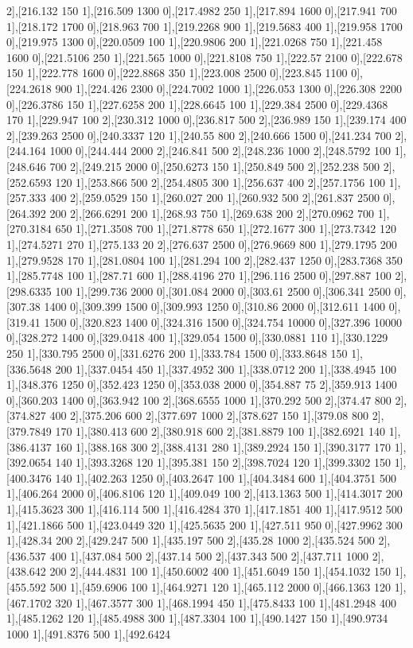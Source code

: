 {2],[216.132 150 1],[216.509 1300 0],[217.4982 250 1],[217.894 1600 0],[217.941 700 1],[218.172 1700 0],[218.963 700 1],[219.2268 900 1],[219.5683 400 1],[219.958 1700 0],[219.975 1300 0],[220.0509 100 1],[220.9806 200 1],[221.0268 750 1],[221.458 1600 0],[221.5106 250 1],[221.565 1000 0],[221.8108 750 1],[222.57 2100 0],[222.678 150 1],[222.778 1600 0],[222.8868 350 1],[223.008 2500 0],[223.845 1100 0],[224.2618 900 1],[224.426 2300 0],[224.7002 1000 1],[226.053 1300 0],[226.308 2200 0],[226.3786 150 1],[227.6258 200 1],[228.6645 100 1],[229.384 2500 0],[229.4368 170 1],[229.947 100 2],[230.312 1000 0],[236.817 500 2],[236.989 150 1],[239.174 400 2],[239.263 2500 0],[240.3337 120 1],[240.55 800 2],[240.666 1500 0],[241.234 700 2],[244.164 1000 0],[244.444 2000 2],[246.841 500 2],[248.236 1000 2],[248.5792 100 1],[248.646 700 2],[249.215 2000 0],[250.6273 150 1],[250.849 500 2],[252.238 500 2],[252.6593 120 1],[253.866 500 2],[254.4805 300 1],[256.637 400 2],[257.1756 100 1],[257.333 400 2],[259.0529 150 1],[260.027 200 1],[260.932 500 2],[261.837 2500 0],[264.392 200 2],[266.6291 200 1],[268.93 750 1],[269.638 200 2],[270.0962 700 1],[270.3184 650 1],[271.3508 700 1],[271.8778 650 1],[272.1677 300 1],[273.7342 120 1],[274.5271 270 1],[275.133 20 2],[276.637 2500 0],[276.9669 800 1],[279.1795 200 1],[279.9528 170 1],[281.0804 100 1],[281.294 100 2],[282.437 1250 0],[283.7368 350 1],[285.7748 100 1],[287.71 600 1],[288.4196 270 1],[296.116 2500 0],[297.887 100 2],[298.6335 100 1],[299.736 2000 0],[301.084 2000 0],[303.61 2500 0],[306.341 2500 0],[307.38 1400 0],[309.399 1500 0],[309.993 1250 0],[310.86 2000 0],[312.611 1400 0],[319.41 1500 0],[320.823 1400 0],[324.316 1500 0],[324.754 10000 0],[327.396 10000 0],[328.272 1400 0],[329.0418 400 1],[329.054 1500 0],[330.0881 110 1],[330.1229 250 1],[330.795 2500 0],[331.6276 200 1],[333.784 1500 0],[333.8648 150 1],[336.5648 200 1],[337.0454 450 1],[337.4952 300 1],[338.0712 200 1],[338.4945 100 1],[348.376 1250 0],[352.423 1250 0],[353.038 2000 0],[354.887 75 2],[359.913 1400 0],[360.203 1400 0],[363.942 100 2],[368.6555 1000 1],[370.292 500 2],[374.47 800 2],[374.827 400 2],[375.206 600 2],[377.697 1000 2],[378.627 150 1],[379.08 800 2],[379.7849 170 1],[380.413 600 2],[380.918 600 2],[381.8879 100 1],[382.6921 140 1],[386.4137 160 1],[388.168 300 2],[388.4131 280 1],[389.2924 150 1],[390.3177 170 1],[392.0654 140 1],[393.3268 120 1],[395.381 150 2],[398.7024 120 1],[399.3302 150 1],[400.3476 140 1],[402.263 1250 0],[403.2647 100 1],[404.3484 600 1],[404.3751 500 1],[406.264 2000 0],[406.8106 120 1],[409.049 100 2],[413.1363 500 1],[414.3017 200 1],[415.3623 300 1],[416.114 500 1],[416.4284 370 1],[417.1851 400 1],[417.9512 500 1],[421.1866 500 1],[423.0449 320 1],[425.5635 200 1],[427.511 950 0],[427.9962 300 1],[428.34 200 2],[429.247 500 1],[435.197 500 2],[435.28 1000 2],[435.524 500 2],[436.537 400 1],[437.084 500 2],[437.14 500 2],[437.343 500 2],[437.711 1000 2],[438.642 200 2],[444.4831 100 1],[450.6002 400 1],[451.6049 150 1],[454.1032 150 1],[455.592 500 1],[459.6906 100 1],[464.9271 120 1],[465.112 2000 0],[466.1363 120 1],[467.1702 320 1],[467.3577 300 1],[468.1994 450 1],[475.8433 100 1],[481.2948 400 1],[485.1262 120 1],[485.4988 300 1],[487.3304 100 1],[490.1427 150 1],[490.9734 1000 1],[491.8376 500 1],[492.6424 }
